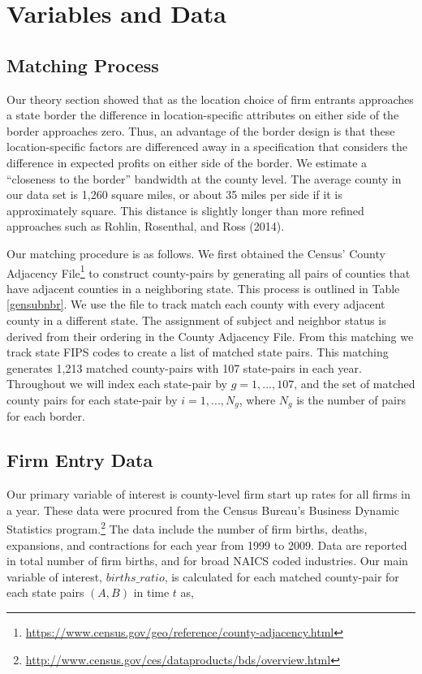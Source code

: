 \documentclass[12pt,a4paper]{article}
\begin{document}
\section{Variables and Data}

\subsection{Matching Process}

Our theory section showed that as the location choice of firm entrants approaches a state border the  difference in location-specific attributes on either side of the border approaches zero.  Thus, an advantage of the border design is that these location-specific factors are differenced away in a specification that considers the difference in expected profits on either side of the border.  We estimate a “closeness to the border” bandwidth at the county level. The average county in our data set is 1,260 square miles, or about 35 miles per side if it is approximately square. This distance is slightly longer than more refined approaches such as Rohlin, Rosenthal, and Ross (2014). 

Our matching procedure is as follows. We first obtained the Census' County Adjacency File\footnote{\url{https://www.census.gov/geo/reference/county-adjacency.html}} to construct county-pairs by generating all pairs of counties that have adjacent counties in a neighboring state. This process is outlined in Table \ref{gensubnbr}. We use the file to track match each county with every adjacent county in a different state. The assignment of subject and neighbor status is derived from their ordering in the County Adjacency File. From this matching we track state FIPS codes to create a list of matched state pairs. This matching generates 1,213 matched county-pairs with 107 state-pairs in each year. Throughout we will index each state-pair by $g = 1,...,107$, and the set of matched county pairs for each state-pair by $i = 1,...,N_{g}$, where $N_g$ is the number of pairs for each border.


\subsection{Firm Entry Data}

Our primary variable of interest is county-level firm start up rates for all firms in a year. These data were procured from the Census Bureau’s Business Dynamic Statistics program.\footnote{\url{http://www.census.gov/ces/dataproducts/bds/overview.html}} The data include the number of firm births, deaths, expansions, and contractions for each year from 1999 to 2009. Data are reported in total number of firm births, and for broad NAICS coded industries. Our main variable of interest, $births\_ratio$, is calculated for each matched county-pair for each state pairs $(A, B)$ in time $t$ as, 
\end{document}

